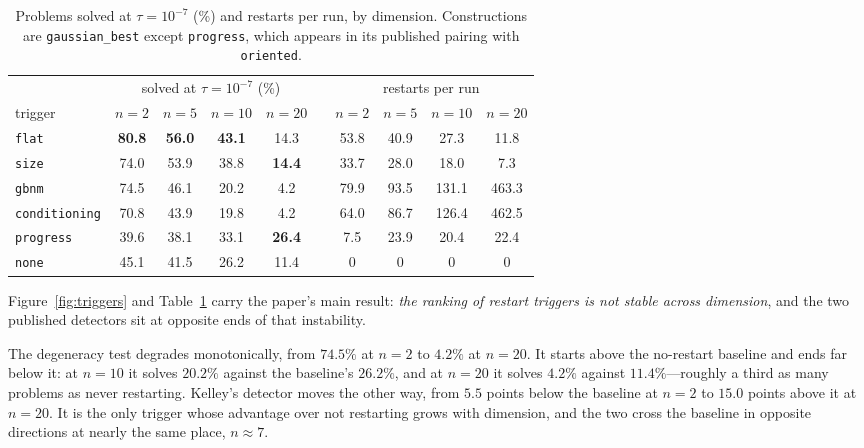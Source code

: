 \documentclass[11pt,a4paper]{article}
\begin{document}
\begin{table}[t]
\centering
\caption{Problems solved at $\tau=10^{-7}$ (\%) and restarts per run, by
dimension. Constructions are \texttt{gaussian\_best} except \texttt{progress},
which appears in its published pairing with \texttt{oriented}.}
\label{tab:triggers}
\small
\begin{tabular}{lcccc c cccc}
\toprule
& \multicolumn{4}{c}{solved at $\tau=10^{-7}$ (\%)} && \multicolumn{4}{c}{restarts per run} \\
\cmidrule(lr){2-5}\cmidrule(lr){7-10}
trigger & $n{=}2$ & $n{=}5$ & $n{=}10$ & $n{=}20$ && $n{=}2$ & $n{=}5$ & $n{=}10$ & $n{=}20$ \\
\midrule
\texttt{flat}          & \textbf{80.8} & \textbf{56.0} & \textbf{43.1} & 14.3 && 53.8 & 40.9 & 27.3 & 11.8 \\
\texttt{size}          & 74.0 & 53.9 & 38.8 & \textbf{14.4} && 33.7 & 28.0 & 18.0 & 7.3 \\
\texttt{gbnm}          & 74.5 & 46.1 & 20.2 & 4.2 && 79.9 & 93.5 & 131.1 & 463.3 \\
\texttt{conditioning}  & 70.8 & 43.9 & 19.8 & 4.2 && 64.0 & 86.7 & 126.4 & 462.5 \\
\texttt{progress}      & 39.6 & 38.1 & 33.1 & \textbf{26.4} && 7.5 & 23.9 & 20.4 & 22.4 \\
\texttt{none}          & 45.1 & 41.5 & 26.2 & 11.4 && 0 & 0 & 0 & 0 \\
\bottomrule
\end{tabular}
\end{table}

Figure~\ref{fig:triggers} and Table~\ref{tab:triggers} carry the paper's main
result: \emph{the ranking of restart triggers is not stable across dimension},
and the two published detectors sit at opposite ends of that instability.

The degeneracy test degrades monotonically, from $74.5\%$ at $n=2$ to $4.2\%$ at
$n=20$. It starts above the no-restart baseline and ends far below it: at $n=10$
it solves $20.2\%$ against the baseline's $26.2\%$, and at $n=20$ it solves
$4.2\%$ against $11.4\%$---roughly a third as many problems as never restarting.
Kelley's detector moves the other way, from $5.5$ points below the baseline at
$n=2$ to $15.0$ points above it at $n=20$. It is the only trigger whose
advantage over not restarting grows with dimension, and the two cross the
baseline in opposite directions at nearly the same place, $n\approx7$.
\end{document}
